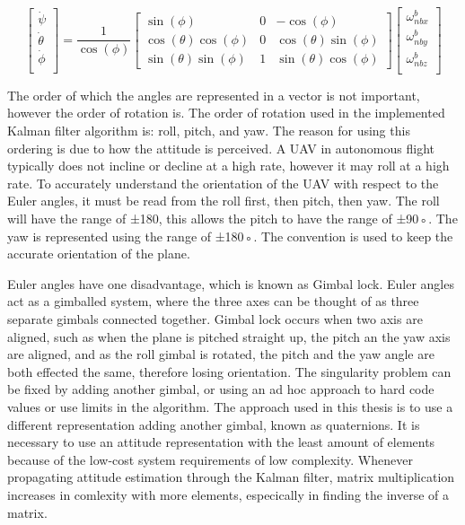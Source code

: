 \begin{equation}
    \begin{bmatrix}
        \dot{\psi}   \\
        \dot{\theta} \\
        \dot{\phi}   \\
    \end{bmatrix}
    =
    \frac{1}{\cos(\phi)}
    \begin{bmatrix}
        \sin(\phi)             & 0 & -\cos(\phi)            \\
        \cos(\theta)\cos(\phi) & 0 & \cos(\theta)\sin(\phi) \\
        \sin(\theta)\sin(\phi) & 1 & \sin(\theta)\cos(\phi)
    \end{bmatrix}
    \begin{bmatrix}
        \omega{^b_{nbx}} \\
        \omega{^b_{nby}} \\
        \omega{^b_{nbz}} \\
    \end{bmatrix}
    \label{eq:euler_equation}
\end{equation}

The order of which the angles are represented in a vector is not important, however the
order of rotation is. The order of rotation used in the implemented Kalman filter algorithm is: roll, pitch, and yaw. The reason for using this ordering is due to how the attitude is perceived. A UAV in autonomous flight typically does not incline or decline at a high rate, however it may roll at a high rate. To accurately understand the orientation of the UAV with respect to the Euler angles, it must be read from the roll first, then pitch, then yaw.
The roll will have the range of ±180, this allows the pitch to have the range of ±90◦. The
yaw is represented using the range of ±180◦. The convention is used to keep the accurate
orientation of the plane.

Euler angles have one disadvantage, which is known as Gimbal lock. Euler angles act
as a gimballed system, where the three axes can be thought of as three separate gimbals
connected together. Gimbal lock occurs when two axis are aligned, such as when the plane
is pitched straight up, the pitch an the yaw axis are aligned, and as the roll gimbal is rotated, the pitch and the yaw angle are both effected the same, therefore losing orientation. The singularity problem can be fixed by adding another gimbal, or using an ad hoc approach to hard code values or use limits in the algorithm. The approach used in this thesis is to use a different representation adding another gimbal, known as quaternions. It is necessary to use an attitude representation with the least amount of elements because of the low-cost system requirements of low complexity. Whenever propagating attitude estimation through the Kalman filter, matrix multiplication increases in comlexity with more elements, especically in finding the inverse of a matrix.

